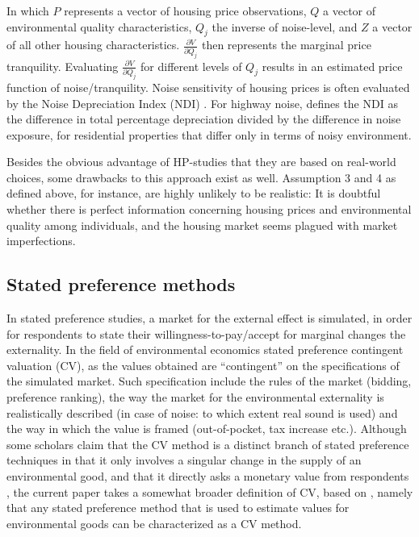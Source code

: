\documentclass[a4paper]{scrartcl}
\begin{document}
In which $P$ represents a vector of housing price observations, $Q$ a vector of environmental quality characteristics, $Q_j$ the inverse of noise-level, and $Z$ a vector of all other housing characteristics. $\frac{\partial V}{\partial Q_j }$ then represents the marginal price tranquility. Evaluating  $\frac{\partial V}{\partial Q_j }$ for different levels of $Q_j$ results in an estimated price function of noise/tranquility. Noise sensitivity of housing prices is often evaluated by the Noise Depreciation Index (NDI) \citep{Walters1975}. For highway noise, \cite{Nelson1982} defines the NDI as the difference in total percentage depreciation divided by the difference in noise exposure, for residential properties that differ only in terms of noisy environment.	

Besides the obvious advantage of HP-studies that they are based on real-world choices, some drawbacks to this approach exist as well. Assumption 3 and 4 as defined above, for instance, are highly unlikely to be realistic: It is doubtful whether there is perfect information concerning housing prices and environmental quality among individuals, and the housing market seems plagued with market imperfections.


\subsection{Stated preference methods}

In stated preference studies, a market for the external effect is simulated, in order for respondents to state their willingness-to-pay/accept for marginal changes the externality. In the field of environmental economics stated preference  contingent valuation (CV), as the values obtained are “contingent” on the specifications of the simulated market. Such specification include the rules of the market (bidding, preference ranking), the way the market for the environmental externality is realistically described (in case of noise: to which extent real sound is used) and the way in which the value is framed (out-of-pocket, tax increase etc.)\citep{Carson2005}. Although some scholars claim that the CV method is a distinct branch of stated preference techniques in that it only involves a singular change in the supply of an environmental good, and that it directly asks a monetary value from respondents \citep{Wardman2004}, the current paper takes a somewhat broader definition of CV, based on \cite{Carson2005}, namely that any stated preference method that is used to estimate values for environmental goods can be characterized as a CV method.
\end{document}
